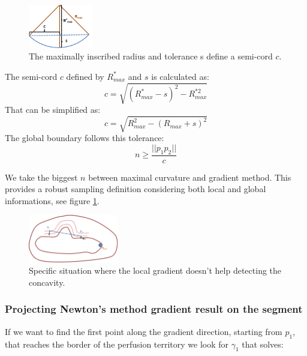 \documentclass[11pt,a4paper]{article}
\begin{document}
\begin{figure}[h!]
			\centering
			\includegraphics[width=0.25\textwidth]{Drawings/CurvatureTolerance.png}
			\caption{The maximally inscribed radius and tolerance s define a semi-cord $c$.}
\end{figure}

The semi-cord $c$ defined by $R_{max}^*$ and $s$ is calculated as:
\begin{equation}
c = \sqrt{(R_{max}^*-s)^2 - R_{max}^{*2}}
\end{equation} 
That can be simplified as:
\begin{equation}
c = \sqrt{R_{max}^2 - (R_{max} + s)^2}
\end{equation}
The global boundary follows this tolerance:
\begin{equation}
n \geq \frac{||p_1p_2||}{c}
\end{equation}

We take the biggest $n$ between maximal curvature and gradient method. This provides a robust sampling definition considering both local and global informations, see figure \ref{test sampling}.
\begin{figure}[h!]
			\label{test sampling}
			\centering
			\includegraphics[width=0.35\textwidth]{Drawings/CurvatureTestExample2.png}
			\caption{Specific situation where the local gradient doesn't help detecting the concavity.}
\end{figure}

\subsubsection{Projecting Newton's method gradient result on the segment}


If we want to find the first point along the gradient direction, starting from $p_1$, that reaches the border of the perfusion territory we look for $\gamma_1$ that solves:
\end{document}
